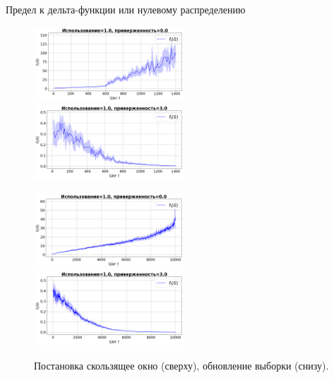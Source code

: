 \documentclass{beamer}
\begin{document}
\begin{frame}{Предел к дельта-функции или нулевому распределению}
        \begin{figure}
            \centering
            \includegraphics[width=0.5\textwidth]{fig/ft0_sw_synthetic_sgd_model_50_1.0_0.0.png}~
            \includegraphics[width=0.5\textwidth]{fig/ft0_sw_synthetic_sgd_model_50_1.0_3.0.png}

            \includegraphics[width=0.5\textwidth]{fig/ft0_su_synthetic_sgd_model_50_1.0_0.0.png}~
            \includegraphics[width=0.5\textwidth]{fig/ft0_su_synthetic_sgd_model_50_1.0_3.0.png}
    
            Постановка скользящее окно (сверху), обновление выборки (снизу).
        \end{figure}
    \end{frame}
\end{document}
